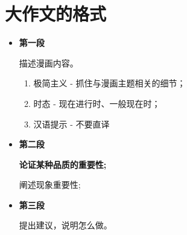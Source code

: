 \chapter*{大作文的格式}

\begin{itemize}
    \item \textbf{第一段}
    
    描述漫画内容。

    \begin{enumerate}[label = \Alph*.]
        \item 极简主义 - 抓住与漫画主题相关的细节；
        \item 时态 - 现在进行时、一般现在时；
        \item 汉语提示 - 不要直译
    \end{enumerate}
    \item \textbf{第二段}
    
    \textbf{论证某种品质的重要性;}

    阐述现象重要性;
    \item \textbf{第三段}
    
    提出建议，说明怎么做。
\end{itemize}

